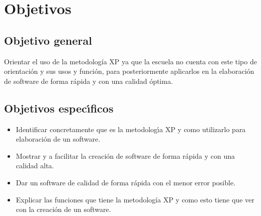 \documentclass[letterpaper,oneside,openany,11pt]{book}
\begin{document}


\chapter{Objetivos}\label{cap.objetivos}

\section{Objetivo general}
\noindent Orientar el uso de la metodología XP ya que la escuela no cuenta con este tipo de orientación y sus usos y función, para posteriormente aplicarlos en la elaboración de software de forma rápida y con una calidad óptima. \\

\section{Objetivos espec\'{\i}ficos}
\begin{itemize}
\item Identificar concretamente que es la metodolog\'{\i}a XP y como utilizarlo para elaboración de un software.

\item Mostrar y a facilitar la creación de software de forma rápida y con una calidad alta.

\item Dar un software de calidad de forma rápida con el menor error posible.

\item Explicar las funciones que tiene la metodología XP y como esto tiene que ver con la creación de un software.

\end{itemize}


\end{document}
